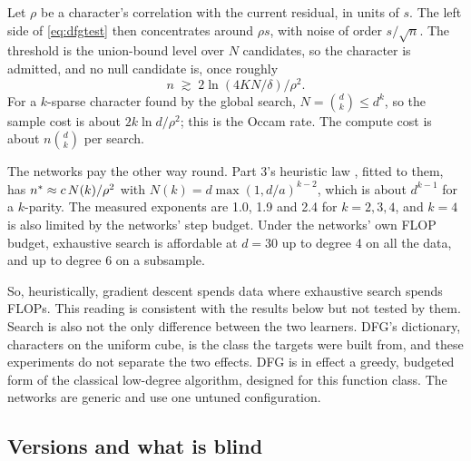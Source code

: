 \begin{remark}\label{rem:lnN}
Let $\rho$ be a character's correlation with the current residual, in units of $s$. The left side of \eqref{eq:dfgtest} then concentrates around $\rho s$, with noise of order $s/\sqrt n$. The threshold is the union-bound level over $N$ candidates, so the character is admitted, and no null candidate is, once roughly
\[
n\;\gtrsim\;2\ln(4KN/\delta)/\rho^2 .
\]
For a $k$-sparse character found by the global search, $N=\binom dk\le d^k$, so the sample cost is about $2k\ln d/\rho^2$; this is the Occam rate. The compute cost is about $n\binom dk$ per search.

The networks pay the other way round. Part 3's heuristic law \cite{gdcircuit2026}, fitted to them, has $n^{*}\approx c\,N(k)/\rho^2$ with $N(k)=d\max(1,d/a)^{k-2}$, which is about $d^{k-1}$ for a $k$-parity. The measured exponents are 1.0, 1.9 and 2.4 for $k=2,3,4$, and $k=4$ is also limited by the networks' step budget. Under the networks' own FLOP budget, exhaustive search is affordable at $d=30$ up to degree 4 on all the data, and up to degree 6 on a subsample.
\end{remark}

So, heuristically, gradient descent spends data where exhaustive search spends FLOPs. This reading is consistent with the results below but not tested by them. Search is also not the only difference between the two learners. DFG's dictionary, characters on the uniform cube, is the class the targets were built from, and these experiments do not separate the two effects. DFG is in effect a greedy, budgeted form of the classical low-degree algorithm, designed for this function class. The networks are generic and use one untuned configuration.

\subsection{Versions and what is blind}\label{sec:dfgversions}

